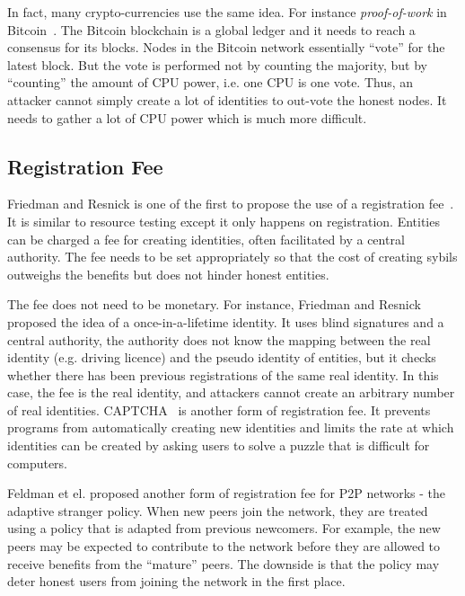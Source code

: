 In fact, many crypto-currencies use the same idea. For instance
\emph{proof-of-work} in Bitcoin~\cite{nakamoto2008bitcoin}. The Bitcoin
blockchain is a global ledger and it needs to reach a consensus for its blocks.
Nodes in the Bitcoin network essentially ``vote'' for the latest block. But the
vote is performed not by counting the majority, but by ``counting'' the amount
of CPU power, i.e. one CPU is one vote. Thus, an attacker cannot simply create a
lot of identities to out-vote the honest nodes. It needs to gather a lot of CPU
power which is much more difficult.


\subsection{Registration Fee}\label{sec:registration-fee}

Friedman and Resnick is one of the first to propose the use of a registration
fee~\cite{resnick2001social}. It is similar to resource testing except it only
happens on registration. Entities can be charged a fee for creating identities,
often facilitated by a central authority. The fee needs to be set appropriately
so that the cost of creating sybils outweighs the benefits but does not hinder
honest entities.

The fee does not need to be monetary. For instance, Friedman and Resnick
proposed the idea of a once-in-a-lifetime identity\cite{resnick2001social}. It
uses blind signatures and a central authority, the authority does not know the
mapping between the real identity (e.g. driving licence) and the pseudo identity
of entities, but it checks whether there has been previous registrations of the
same real identity. In this case, the fee is the real identity, and attackers
cannot create an arbitrary number of real identities.
CAPTCHA~\cite{von2003captcha} is another form of registration fee. It prevents
programs from automatically creating new identities and limits the rate at which
identities can be created by asking users to solve a puzzle that is difficult
for computers.

Feldman et el. proposed another form of registration fee for P2P networks - the
adaptive stranger policy\cite{feldman2004robust}. When new peers join the
network, they are treated using a policy that is adapted from previous
newcomers. For example, the new peers may be expected to contribute to the
network before they are allowed to receive benefits from the ``mature'' peers.
The downside is that the policy may deter honest users from joining the network
in the first place.

